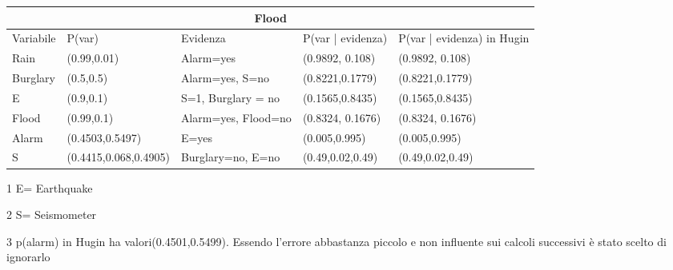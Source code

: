 \documentclass{report}
\begin{document}
\newpage
\begin{table}[hbt!]
\small
\hskip-1.0cm\begin{threeparttable}
\begin{tabular}{ |p{2cm}|p{3cm}|p{2cm}|p{3cm}|p{3cm}|  }
\hline
 \multicolumn{5}{|c|}{Flood} \\
 \hline
Variabile & P(var) & Evidenza & P(var | evidenza) & P(var | evidenza)  in Hugin\\
 \hline
Rain &(0.99,0.01) & Alarm=yes & (0.9892, 0.108) &(0.9892, 0.108)\\
\hline
Burglary & (0.5,0.5) & Alarm=yes, S=no & (0.8221,0.1779)& (0.8221,0.1779)\\
\hline
E & (0.9,0.1) & S=1, Burglary = no & (0.1565,0.8435) & (0.1565,0.8435)\\
\hline
Flood & (0.99,0.1) & Alarm=yes, Flood=no & (0.8324, 0.1676) & (0.8324, 0.1676)\\
\hline
Alarm & (0.4503,0.5497) & E=yes& (0.005,0.995) & (0.005,0.995)\\
\hline
S & (0.4415,0.068,0.4905) & Burglary=no, E=no & (0.49,0.02,0.49) &(0.49,0.02,0.49)\\
\hline
\end{tabular}
\begin{tablenotes}
 	    \item[1] E= Earthquake 
        \item[2] S= Seismometer
        \item[3] p(alarm) in Hugin ha valori(0.4501,0.5499). Essendo l'errore abbastanza piccolo e non influente sui calcoli successivi è stato scelto di ignorarlo
 \end{tablenotes}
\end{threeparttable}
\end{table}
\end{document}
